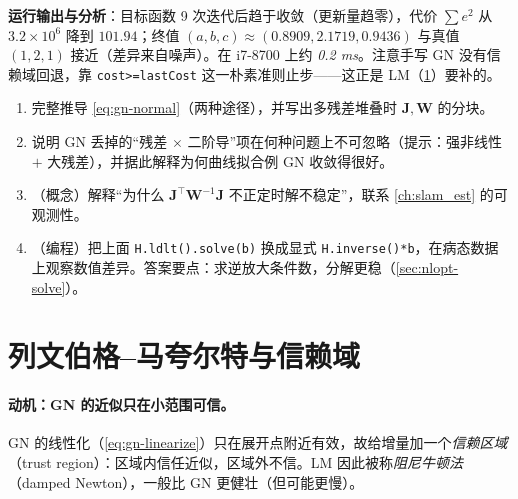 \noindent\textbf{运行输出与分析}\cite{gaoxiang2019slam14}：目标函数 9 次迭代后趋于收敛（更新量趋零），代价 $\sum e^2$ 从 $3.2\times10^6$ 降到 $101.94$；终值 $(a,b,c)\approx(0.8909,2.1719,0.9436)$ 与真值 $(1,2,1)$ 接近（差异来自噪声）。在 i7-8700 上约 \emph{0.2 ms}。注意手写 GN 没有信赖域回退，靠 \texttt{cost>=lastCost} 这一朴素准则止步——这正是 LM（\cref{sec:nlopt-lm}）要补的。

\begin{practice}
\begin{enumerate}
  \item 完整推导 \cref{eq:gn-normal}（两种途径），并写出多残差堆叠时 $\mathbf{J},\mathbf{W}$ 的分块。
  \item 说明 GN 丢掉的“残差 $\times$ 二阶导”项在何种问题上不可忽略（提示：强非线性 $+$ 大残差），并据此解释为何曲线拟合例 GN 收敛得很好。
  \item （概念）解释“为什么 $\mathbf{J}^\top\mathbf{W}^{-1}\mathbf{J}$ 不正定时解不稳定”，联系 \cref{ch:slam_est} 的可观测性。
  \item （编程）把上面 \texttt{H.ldlt().solve(b)} 换成显式 \texttt{H.inverse()*b}，在病态数据上观察数值差异。答案要点：求逆放大条件数，分解更稳（\cref{sec:nlopt-solve}）。
\end{enumerate}
\end{practice}

\section{列文伯格–马夸尔特与信赖域}
\label{sec:nlopt-lm}

\paragraph{动机：GN 的近似只在小范围可信。}
GN 的线性化（\cref{eq:gn-linearize}）只在展开点附近有效，故给增量加一个\emph{信赖区域}（trust region）：区域内信任近似，区域外不信\cite{gaoxiang2019slam14,carlone2026handbook}。LM 因此被称\emph{阻尼牛顿法}（damped Newton），一般比 GN 更健壮（但可能更慢）。

